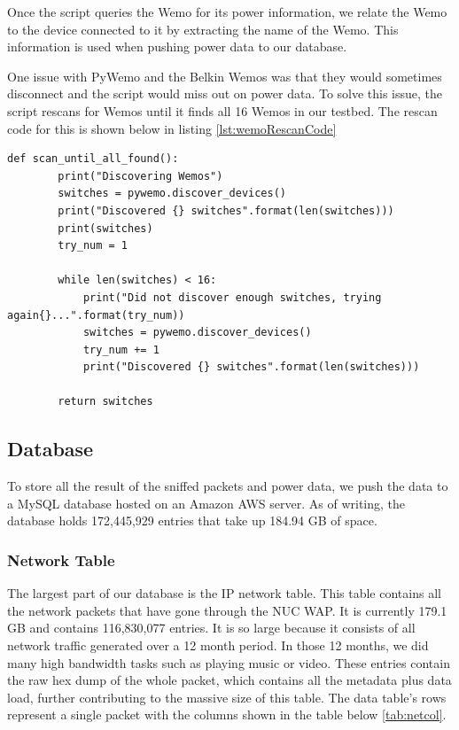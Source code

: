 Once the script queries the Wemo for its power information, we relate the Wemo to the device connected to it by extracting the name of the Wemo. This information is used when pushing power data to our database.

One issue with PyWemo and the Belkin Wemos was that they would sometimes disconnect and the script would miss out on power data. To solve this issue, the script rescans for Wemos until it finds all 16 Wemos in our testbed. The rescan code for this is shown below in listing \ref{lst:wemoRescanCode}

\begin{lstlisting}[label={lst:wemoRescanCode},caption={Rescan if all wemos not found.},captionpos=b]
    def scan_until_all_found():
        print("Discovering Wemos")
        switches = pywemo.discover_devices()
        print("Discovered {} switches".format(len(switches)))
        print(switches)
        try_num = 1

        while len(switches) < 16:
            print("Did not discover enough switches, trying again{}...".format(try_num))
            switches = pywemo.discover_devices()
            try_num += 1
            print("Discovered {} switches".format(len(switches)))

        return switches
    \end{lstlisting}

\subsection{Database}
\label{Database}

To store all the result of the sniffed packets and power data, we push the data to a MySQL database hosted on an Amazon AWS server. As of writing, the database holds 172,445,929 entries that take up 184.94 GB of space.

\subsubsection{Network Table}

The largest part of our database is the IP network table. This table contains all the network packets that have gone through the NUC WAP. It is currently 179.1 GB and contains 116,830,077 entries. It is so large because it consists of all network traffic generated over a 12 month period. In those 12 months, we did many high bandwidth tasks such as playing music or video. These entries contain the raw hex dump of the whole packet, which contains all the metadata plus data load, further contributing to the massive size of this table. The data table's rows represent a single packet with the columns shown in the table below \ref{tab:netcol}.

